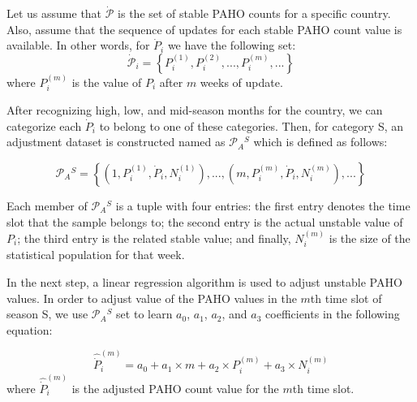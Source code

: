 Let us assume that $\dot{\mathcal{P}}$ is the set of stable PAHO counts for a
specific country. Also, assume that the sequence of updates for each stable PAHO
count value is available. In other words, for $\dot{P}_i$ we have the following
set:
\vspace{-1em} 
\begin{equation}
\dot{\mathcal{P}}_i = \left \{P_i^{(1)},P_i^{(2)},...,P_i^{(m)},...  \right \}
\end{equation}
\noindent
where $P_i^{(m)}$ is the value of $P_i$ after $m$ weeks of update.

After recognizing high, low, and mid-season months for the country, we can
categorize each $\dot{P}_i$ to belong to one of these categories. Then, for
category S, an adjustment dataset is constructed named as $\mathcal{P}_A{^S}$
which is defined as follows:

\vspace{-1em} 
\begin{equation}
\mathcal{P}_A{^S} = \left \{ (1,P_i^{(1)},\dot{P}_i,N_i^{(1)}),...,(m,P_i^{(m)},\dot{P}_i,N_i^{(m)}), ...  \right \}
\end{equation}

Each member of $\mathcal{P}_A{^S}$ is a tuple with four entries: the first entry denotes
the time slot that the sample belongs to; the second entry is the actual unstable
value of $P_i$; the third entry is the related stable value; and finally,
$N_i^{(m)}$ is the size of the statistical population for that week.

In the next step, a linear regression algorithm is used to adjust unstable PAHO
values. In order to adjust value of the PAHO values in the $m$th time slot of
season S, we use $\mathcal{P}_A{^S}$ set to learn $a_0$, $a_1$, $a_2$, and
$a_3$ coefficients in the following equation:

\vspace{-1em} 
\begin{equation}
\hat{\dot{P}}_i^{(m)} = a_0 + a_1 \times m + a_2 \times P_i^{(m)} + a_3 \times N_i^{(m)}
\label{eq:correctionpaho}
\end{equation}
\noindent
where $\hat{\dot{P}}_i^{(m)}$ is the adjusted PAHO count value for the $m$th time slot.

